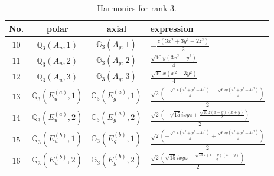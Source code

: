 \documentclass[fleqn,8pt,landscape]{jsarticle}
\begin{document}
\begin{table}[ht!]
\begin{center}
\caption{Harmonics for rank 3.}
\renewcommand{\arraystretch}{1.3}
\begin{tabular}{cccl} \hline \hline
No. & polar & axial & expression \\ \hline
$ 10 $ & $ \mathbb{Q}_{3}(A_{u},1) $ & $ \mathbb{G}_{3}(A_{g},1) $ & $ - \frac{z \left(3 x^{2} + 3 y^{2} - 2 z^{2}\right)}{2} $ \\
$ 11 $ & $ \mathbb{Q}_{3}(A_{u},2) $ & $ \mathbb{G}_{3}(A_{g},2) $ & $ \frac{\sqrt{10} y \left(3 x^{2} - y^{2}\right)}{4} $ \\
$ 12 $ & $ \mathbb{Q}_{3}(A_{u},3) $ & $ \mathbb{G}_{3}(A_{g},3) $ & $ \frac{\sqrt{10} x \left(x^{2} - 3 y^{2}\right)}{4} $ \\
$ 13 $ & $ \mathbb{Q}_{3}(E_{u}^{(a)},1) $ & $ \mathbb{G}_{3}(E_{g}^{(a)},1) $ & $ \frac{\sqrt{2} \left(- \frac{\sqrt{6} x \left(x^{2} + y^{2} - 4 z^{2}\right)}{4} - \frac{\sqrt{6} i y \left(x^{2} + y^{2} - 4 z^{2}\right)}{4}\right)}{2} $ \\
$ 14 $ & $ \mathbb{Q}_{3}(E_{u}^{(a)},2) $ & $ \mathbb{G}_{3}(E_{g}^{(a)},2) $ & $ \frac{\sqrt{2} \left(- \sqrt{15} i x y z + \frac{\sqrt{15} z \left(x - y\right) \left(x + y\right)}{2}\right)}{2} $ \\
$ 15 $ & $ \mathbb{Q}_{3}(E_{u}^{(b)},1) $ & $ \mathbb{G}_{3}(E_{g}^{(b)},1) $ & $ \frac{\sqrt{2} \left(- \frac{\sqrt{6} x \left(x^{2} + y^{2} - 4 z^{2}\right)}{4} + \frac{\sqrt{6} i y \left(x^{2} + y^{2} - 4 z^{2}\right)}{4}\right)}{2} $ \\
$ 16 $ & $ \mathbb{Q}_{3}(E_{u}^{(b)},2) $ & $ \mathbb{G}_{3}(E_{g}^{(b)},2) $ & $ \frac{\sqrt{2} \left(\sqrt{15} i x y z + \frac{\sqrt{15} z \left(x - y\right) \left(x + y\right)}{2}\right)}{2} $ \\
 \hline \hline
\end{tabular}
\end{center}
\end{table}
\end{document}
